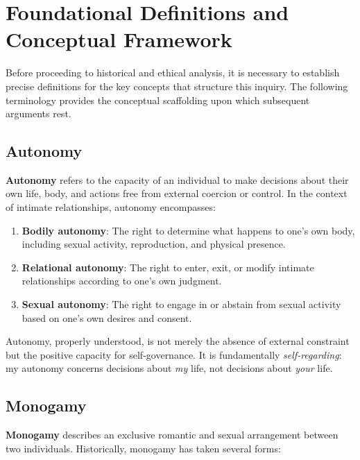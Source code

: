 \documentclass[12pt, letterpaper]{article}
\begin{document}
\section{Foundational Definitions and Conceptual Framework}

Before proceeding to historical and ethical analysis, it is necessary to establish precise definitions for the key concepts that structure this inquiry. The following terminology provides the conceptual scaffolding upon which subsequent arguments rest.

\subsection{Autonomy}

\textbf{Autonomy} refers to the capacity of an individual to make decisions about their own life, body, and actions free from external coercion or control. In the context of intimate relationships, autonomy encompasses:

\begin{enumerate}[label=(\alph*)]
    \item \textbf{Bodily autonomy}: The right to determine what happens to one's own body, including sexual activity, reproduction, and physical presence.
    \item \textbf{Relational autonomy}: The right to enter, exit, or modify intimate relationships according to one's own judgment.
    \item \textbf{Sexual autonomy}: The right to engage in or abstain from sexual activity based on one's own desires and consent.
\end{enumerate}

Autonomy, properly understood, is not merely the absence of external constraint but the positive capacity for self-governance. It is fundamentally \textit{self-regarding}: my autonomy concerns decisions about \textit{my} life, not decisions about \textit{your} life.

\subsection{Monogamy}

\textbf{Monogamy} describes an exclusive romantic and sexual arrangement between two individuals. Historically, monogamy has taken several forms:
\end{document}

